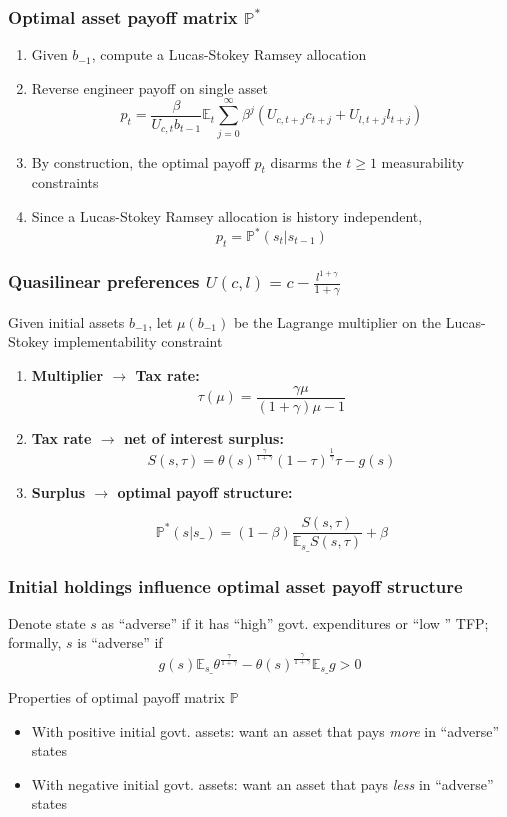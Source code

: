 \documentclass{beamer}
\newcommand{\EE}{\mathbb E}
\begin{document}
  \begin{frame}
\frametitle{Optimal asset payoff matrix $\mathbb{P}^*$}
\begin{enumerate}
 \item  Given $b_{-1}$, compute a Lucas-Stokey Ramsey allocation


 \item Reverse engineer  payoff on single asset
\[
	p_t = \frac{\beta}{U_{c,t}b_{t-1}}\EE_t\sum_{j=0}^\infty\beta^j\left(U_{c,t+j}c_{t+j}+U_{l,t+j}l_{t+j}\right)
\]
\item By construction, the optimal payoff  $p_t$   disarms the  $t\geq 1$
measurability constraints
\item Since a Lucas-Stokey Ramsey allocation is  history independent,
\[p_t=\mathbb{P}^*(s_t|s_{t-1})\]
\end{enumerate}
\end{frame}
%
\begin{frame}
\frametitle{Quasilinear preferences $U(c,l)=c-\frac{l^{1+\gamma}}{1+\gamma}$}
Given
 initial assets $b_{-1}$,  let $\mu(b_{-1})$ be the Lagrange multiplier on the Lucas-Stokey implementability constraint
\begin{enumerate}

 \item \textbf{Multiplier $\to$ Tax rate:}
 \[
		\tau(\mu) = \frac{\gamma\mu}{(1+\gamma)\mu-1}
	\]
 \item \textbf{Tax rate $\to$ net of interest surplus:}
 \[
		S(s,\tau) = \theta(s)^\frac\gamma{1+\gamma}(1-\tau)^\frac1\gamma\tau-g(s)
	\]
\item \textbf{Surplus $\to$ optimal payoff structure:}

\[
 \mathbb{P}^*(s|s\_) = (1-\beta)\frac{S(s,\tau)}{\EE_{s\_} S(s,\tau)} + \beta
 \]

 \end{enumerate}

\end{frame}

%
% 		
\begin{frame}		
   \frametitle{Initial holdings influence optimal asset payoff structure}
Denote state $s$ as ``adverse''  if it has ``high'' govt. expenditures or ``low '' TFP; formally, $s$ is ``adverse'' if
\[   g(s)\EE_{s\_}\theta^\frac{\gamma}{1+\gamma}-\theta(s)^\frac\gamma{1+\gamma}\EE_{s\_} g >0\]

Properties of  optimal payoff matrix $\mathbb{P}$

\begin{itemize}
 \item With positive initial govt. assets: want an asset  that pays {\em more} in ``adverse'' states
 \item With negative initial govt. assets: want an asset  that pays {\em less} in ``adverse'' states
\end{itemize}
\end{frame}
\end{document}
